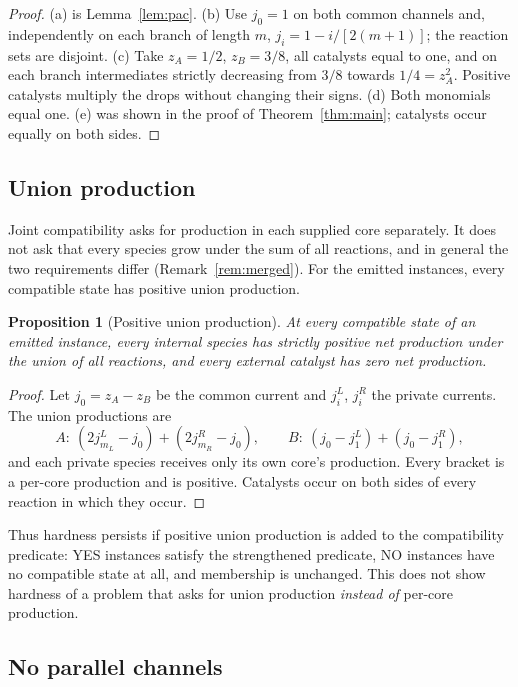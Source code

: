 \documentclass[11pt,a4paper]{article}
\theoremstyle{plain}
\newtheorem{proposition}[theorem]{Proposition}
\theoremstyle{definition}
\theoremstyle{remark}
\begin{document}
\begin{proof}
(a) is Lemma~\ref{lem:pac}. (b) Use $j_0=1$ on both common channels and, independently on each branch of length $m$, $j_i=1-i/[2(m+1)]$; the reaction sets are disjoint. (c) Take $z_A=1/2$, $z_B=3/8$, all catalysts equal to one, and on each branch intermediates strictly decreasing from $3/8$ towards $1/4=z_A^2$. Positive catalysts multiply the drops without changing their signs. (d) Both monomials equal one. (e) was shown in the proof of Theorem~\ref{thm:main}; catalysts occur equally on both sides.
\end{proof}

\subsection{Union production}

Joint compatibility asks for production in each supplied core separately. It does not ask that every species grow under the sum of all reactions, and in general the two requirements differ (Remark~\ref{rem:merged}). For the emitted instances, every compatible state has positive union production.

\begin{proposition}[Positive union production]\label{prop:union}
At every compatible state of an emitted instance, every internal species has strictly positive net production under the union of all reactions, and every external catalyst has zero net production.
\end{proposition}

\begin{proof}
Let $j_0=z_A-z_B$ be the common current and $j^L_i$, $j^R_i$ the private currents. The union productions are
\[
 A:\ (2j^L_{m_L}-j_0)+(2j^R_{m_R}-j_0),\qquad B:\ (j_0-j^L_1)+(j_0-j^R_1),
\]
and each private species receives only its own core's production. Every bracket is a per-core production and is positive. Catalysts occur on both sides of every reaction in which they occur.
\end{proof}

Thus hardness persists if positive union production is added to the compatibility predicate: YES instances satisfy the strengthened predicate, NO instances have no compatible state at all, and membership is unchanged. This does not show hardness of a problem that asks for union production \emph{instead of} per-core production.

\subsection{No parallel channels}
\end{document}
